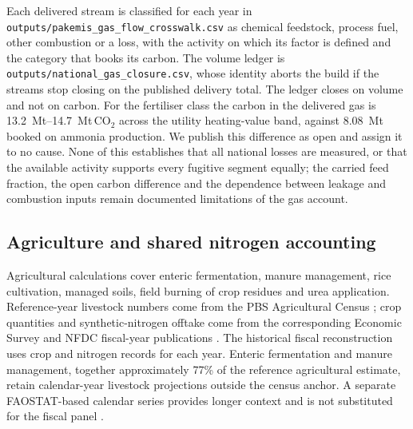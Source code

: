 \documentclass[essd]{copernicus}
\begin{document}
Each delivered stream is classified for each year in \texttt{outputs/pakemis\_gas\_flow\_crosswalk.csv} as chemical feedstock, process fuel, other combustion or a loss, with the activity on which its factor is defined and the category that books its carbon. The volume ledger is \texttt{outputs/national\_gas\_closure.csv}, whose identity aborts the build if the streams stop closing on the published delivery total. The ledger closes on volume and not on carbon. For the fertiliser class the carbon in the delivered gas is \SIrange{13.2}{14.7}{\mega\tonne}\,CO$_2$ across the utility heating-value band, against \SI{8.08}{\mega\tonne} booked on ammonia production. We publish this difference as open and assign it to no cause. None of this establishes that all national losses are measured, or that the available activity supports every fugitive segment equally; the carried feed fraction, the open carbon difference and the dependence between leakage and combustion inputs remain documented limitations of the gas account.

\subsection{Agriculture and shared nitrogen accounting}
\label{sec:agriculture_methods}

Agricultural calculations cover enteric fermentation, manure management, rice cultivation, managed soils, field burning of crop residues and urea application. Reference-year livestock numbers come from the PBS Agricultural Census \citep{PBSAgri2026}; crop quantities and synthetic-nitrogen offtake come from the corresponding Economic Survey and NFDC fiscal-year publications \citep{MoF2024,NFDC2024}. The historical fiscal reconstruction uses crop and nitrogen records for each year. Enteric fermentation and manure management, together approximately 77\% of the reference agricultural estimate, retain calendar-year livestock projections outside the census anchor. A separate FAOSTAT-based calendar series provides longer context and is not substituted for the fiscal panel \citep{FAOSTAT2025}.
\end{document}
